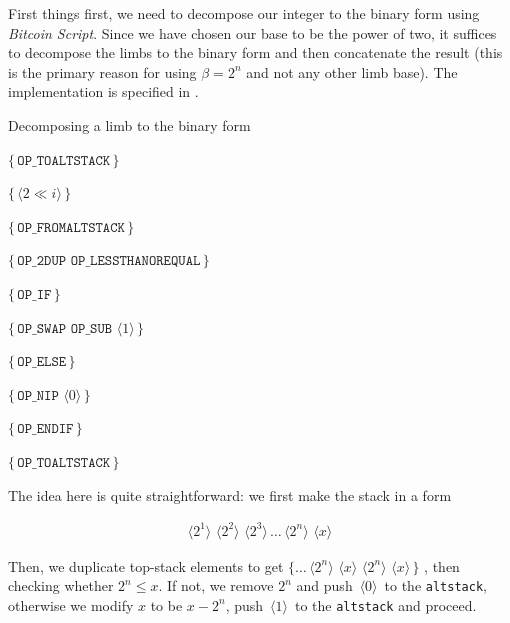 \documentclass{iacrtrans}
\newcommand{\elem}[1]{\, \langle #1 \rangle \,}
\newcommand{\opcode}[1]{\, \texttt{#1} \,}
\newcommand{\script}[1]{ $\big\{ #1 \big\}$ }
\begin{document}
First things first, we need to decompose our integer to the binary form using \textit{Bitcoin Script}. Since we have chosen our base to be the power of two, it suffices to decompose the limbs to the binary form and then concatenate the result (this is the primary reason for using $\beta=2^n$ and not any other limb base). The implementation is specified in .

\begin{algorithm}
\caption{Decomposing a limb to the binary form}\label{alg:script_to_binary_form}

\script{\opcode{OP\_TOALTSTACK}} 

 {
    \script{\elem{2 \ll i}} 
}

\script{\opcode{OP\_FROMALTSTACK}} 

 {
    \script{\opcode{OP\_2DUP} \opcode{OP\_LESSTHANOREQUAL}}
    
    \script{\opcode{OP\_IF}}
    
        \hspace{10px}\script{\opcode{OP\_SWAP} \opcode{OP\_SUB} \elem{1}}
    
    \script{\opcode{OP\_ELSE}}
    
        \hspace{10px}\script{\opcode{OP\_NIP} \elem{0}}
    
    \script{\opcode{OP\_ENDIF}}
    
    \script{\opcode{OP\_TOALTSTACK}}
}
\end{algorithm}

The idea here is quite straightforward: we first make the stack in a form
\begin{empheqboxed}
\begin{align*}
    \elem{2^1} \elem{2^2} \elem{2^3} \dots \elem{2^n} \elem{x}
\end{align*}
\end{empheqboxed}

Then, we duplicate top-stack elements to get \script{\dots \elem{2^n} \elem{x} \elem{2^n} \elem{x}}, then checking whether $2^n \leq x$. If not, we remove $2^n$ and push $\elem{0}$ to the \texttt{altstack}, otherwise we modify $x$ to be $x - 2^n$, push $\elem{1}$ to the \texttt{altstack} and proceed. 
\end{document}
